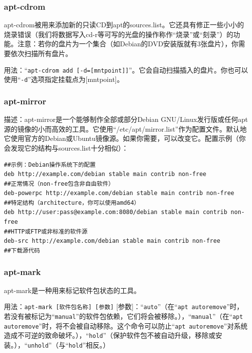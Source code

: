 \subsubsection{apt-cdrom}
\cite{manaptcd}\par
apt-cdrom被用来添加新的只读CD到apt的sources.list。它还具有修正一些小小的烧录错误（我们将数据写入cd-r等可写的光盘的操作称作“烧录”或“刻录”）的功能。注意：若你的盘片为一个集合（如Debian的DVD安装版就有3张盘片），你需要依次扫描所有盘片。\par
用法：“\verb|apt-cdrom add [-d=[mntpoint]]|”。它会自动扫描插入的盘片。你也可以使用“\verb|-d|”选项指定挂载点为[mntpoint]。\par
\subsubsection{apt-mirror}
描述：apt-mirror是一个能够制作全部或部分Debian GNU/Linux发行版或任何apt源的镜像的小而高效的工具。它使用“/etc/apt/mirror.list”作为配置文件。默认地它使用官方的Debian或Ubuntu镜像源。如果你需要，可以改变它。配置示例（你会发现它的结构与sources.list十分相似）：
\begin{verbatim}
##示例：Debian操作系统下的配置
deb http://example.com/debian stable main contrib non-free
##正常情况（non-free包含非自由软件）
deb-powerpc http://example.com/debian stable main contrib non-free
##特定结构（architecture，你可以使用amd64）
deb http://user:pass@example.com:8080/debian stable main contrib non-free
##HTTP或FTP或非标准的软件源
deb-src http://example.com/debian stable main contrib non-free
##下载源代码
\end{verbatim}
\subsubsection{apt-mark}
\cite{manaptmark}\par
apt-mark是一种用来标记软件包状态的工具。\par
用法：\verb|apt-mark [软件包名称] [参数]|
[参数]：“\verb|auto|”（在“\verb|apt autoremove|”时，若没有被标记为“\verb|manual|”的软件包依赖，它们将会被移除。），“\verb|manual|”（在“\verb|apt autoremove|”时，将不会被自动移除。{\color{red}这个命令可以防止“\verb|apt autoremove|”对系统造成不可逆的致命破坏。}），“\verb|hold|”（保护软件包不被自动升级，移除或安装。），“\verb|unhold|”（与“\verb|hold|”相反。）

